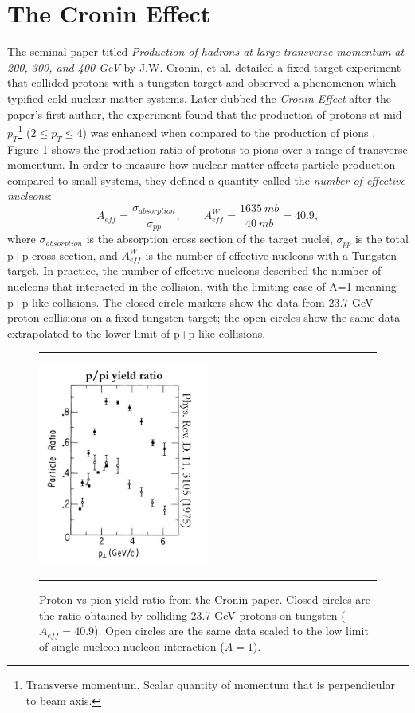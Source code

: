 \section{The Cronin Effect}
The seminal paper titled \textit{Production of hadrons at large transverse momentum at 200, 300, and 400 GeV} by J.W. Cronin, et al. detailed a fixed target experiment that collided protons with a tungsten target and observed a phenomenon which typified cold nuclear matter systems. Later dubbed the \textit{Cronin Effect} after the paper's first author, the experiment found that the production of protons at mid $p_{T}$\footnote{Transverse momentum. Scalar quantity of momentum that is perpendicular to beam axis.} ($2\leq p_{T} \leq 4$) was enhanced when compared to the production of pions \citep{croninpaper}. Figure \ref{fig:croninratio} shows the production ratio of protons to pions over a range of transverse momentum. In order to measure how nuclear matter affects particle production compared to small systems, they defined a quantity called the \textit{number of effective nucleons}:
\begin{equation}
A_{eff} = \frac{\sigma_{absorption}}{\sigma_{pp}}, \qquad A^W_{eff} = \frac{1635\: mb}{40\: mb} = 40.9,
\end{equation}
where $\sigma_{absorption}$ is the absorption cross section of the target nuclei, $\sigma_{pp}$ is the total p+p cross section, and $A^W_{eff}$ is the number of effective nucleons with a Tungsten target. In practice, the number of effective nucleons described the number of nucleons that interacted in the collision, with the limiting case of A=1 meaning p+p like collisions. The closed circle markers show the data from 23.7 GeV proton collisions on a fixed tungsten target; the open circles show the same data extrapolated to the lower limit of p+p like collisions.
\begin{figure}[htbp!]
  \centering    \rule{35em}{0.5pt}
    \includegraphics[width=0.5\textwidth]{prevplots/croninratio.JPG}

  \caption[Proton vs pion yield ratio from the Cronin paper]{Proton vs pion yield ratio from the Cronin paper. Closed circles are the ratio obtained by colliding 23.7 GeV protons on tungsten ($A_{eff}= 40.9$). Open circles are the same data scaled to the low limit of single nucleon-nucleon interaction ($A=1$).}
  \label{fig:croninratio}    \rule{35em}{0.5pt}
\end{figure}

